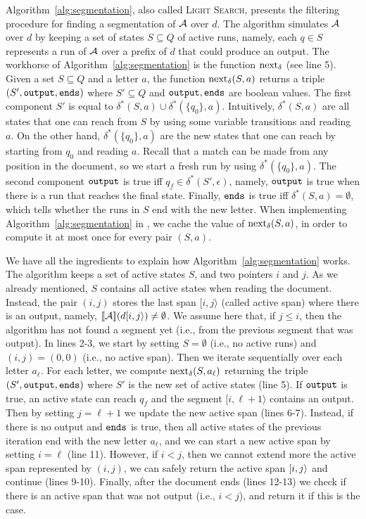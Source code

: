 Algorithm~\ref{alg:segmentation}, also called \textsc{Light Search}, presents
the filtering procedure for finding a segmentation of $\mathcal{A}$ over $d$. The
algorithm simulates $\mathcal{A}$ over $d$ by keeping a set of states $S \subseteq Q$ of
active runs, namely, each $q \in S$ represents a run of $\mathcal{A}$ over a prefix of
$d$ that could produce an output. The workhorse of
Algorithm~\ref{alg:segmentation} is the function $\operatorname{next}_{\delta}$ (see line 5). Given a
set $S \subseteq Q$ and a letter $a$, the function $\operatorname{next}_{\delta}(S, a)$ returns a
triple $(S', \texttt{output}, \texttt{ends})$ where $S' \subseteq Q$ and $\texttt{output}, \texttt{ends}$
are boolean values. The first component $S'$ is equal to $\delta^*(S, a) \cup
\delta^*(\{q_0\}, a)$. Intuitively, $\delta^*(S, a)$ are all states that one can
reach from $S$  by using some variable transitions and reading~$a$. On the other
hand, $\delta^*(\{q_0\}, a)$ are the new states that one can reach by starting
from $q_0$ and reading $a$. Recall that a match can be made from any position in
the document, so we start a fresh run by using $\delta^*(\{q_0\}, a)$. The
second component $\texttt{output}$ is true iff $q_f \in \delta^*(S', \epsilon)$,
namely, $\texttt{output}$ is true when there is a run that reaches the final state.
Finally, $\texttt{ends}$ is true iff $\delta^*(S, a) = \emptyset$, which tells whether
the runs in $S$ end with the new letter. When implementing
Algorithm~\ref{alg:segmentation} in \rematch, we cache the value of $\operatorname{next}_{\delta}(S,
a)$, in order to compute it at most once for every pair $(S,a)$.

We have all the ingredients to explain how Algorithm~\ref{alg:segmentation}
works. The algorithm keeps a set of active states $S$, and two pointers $i$ and
$j$. As we already mentioned, $S$ contains all active states when reading the
document. Instead, the pair $(i, j)$ stores the last span $[i, j\rangle$ (called
active span) where there is an output, namely, $\llbracket\mathcal{A}\rrbracket(d[i, j\rangle) \neq
\emptyset$. We assume here that, if $j \leq i$, then the algorithm has not found
a segment yet (i.e., from the previous segment that was output). In lines 2-3,
we start by setting $S = \emptyset$ (i.e., no active runs) and $(i,j) = (0,0)$
(i.e., no active span). Then we iterate sequentially over each letter $a_\ell$.
For each letter, we compute $\operatorname{next}_{\delta}(S, a_\ell)$ returning the triple $(S',
\texttt{output}, \texttt{ends})$ where $S'$ is the new set of active states (line 5). If
$\texttt{output}$ is true, an active state can reach $q_f$ and the segment $[i,
\ell+1\rangle$ contains an output. Then by setting $j = \ell+1$ we update the
new active span (lines 6-7). Instead, if there is no output and $\texttt{ends}$ is
true, then all active states of the previous iteration end with the new letter
$a_{\ell}$, and we can start a new active span by setting $i = \ell$ (line 11).
However, if $i < j$, then we cannot extend more the active span represented by
$(i,j)$, we can safely return the active span $[i, j\rangle$ and continue (lines
9-10). Finally, after the document ends (lines 12-13) we check if there is an
active span that was not output (i.e., $i < j$), and return it if this is the
case.

